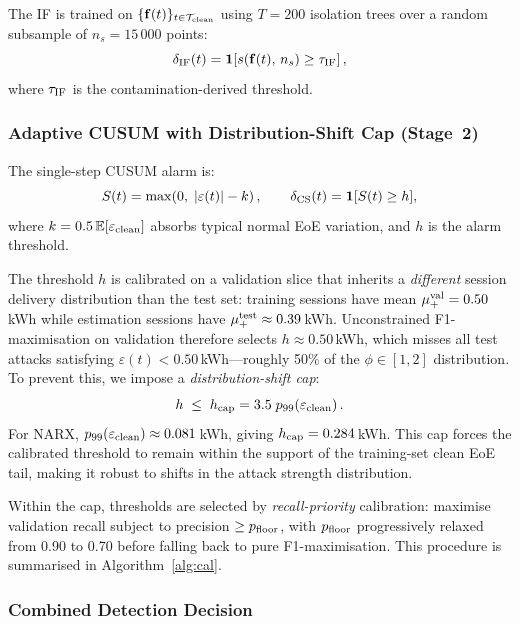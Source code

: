 \documentclass[journal]{IEEEtran}
\begin{document}
The IF is trained on $\{\mathbf{f}(t)\}_{t\in\mathcal{T}_{\rm clean}}$
using $T=200$ isolation trees over a random subsample of
$n_s=15\,000$ points:
\begin{equation}
  \delta_{\rm IF}(t) =
  \mathbf{1}\!\left[
    s\!\left(\mathbf{f}(t),\,n_s\right) \geq \tau_{\rm IF}
  \right],
  \label{eq:iflabel}
\end{equation}
where $\tau_{\rm IF}$ is the contamination-derived threshold.

\subsubsection{Adaptive CUSUM with Distribution-Shift Cap (Stage~2)}

The single-step CUSUM alarm is:
\begin{equation}
  S(t) = \max\!\left(0,\;|\varepsilon(t)| - k\right),
  \qquad
  \delta_{\rm CS}(t) = \mathbf{1}[S(t)\geq h],
  \label{eq:cusumfull}
\end{equation}
where $k = 0.5\,\mathbb{E}[\varepsilon_{\rm clean}]$ absorbs
typical normal EoE variation, and $h$ is the alarm threshold.

The threshold $h$ is calibrated on a validation slice that
inherits a \emph{different} session delivery distribution than the
test set: training sessions have mean $\mu_+^{\rm val}=0.50$\,kWh
while estimation sessions have $\mu_+^{\rm test}\approx0.39$\,kWh.
Unconstrained F1-maximisation on validation therefore selects
$h\approx0.50$\,kWh, which misses all test attacks satisfying
$\varepsilon(t)<0.50$\,kWh---roughly 50\% of the
$\phi\in[1,2]$ distribution.
To prevent this, we impose a \emph{distribution-shift cap}:
\begin{equation}
  h \;\leq\; h_{\rm cap} = 3.5\;p_{99}\!\left(\varepsilon_{\rm clean}\right).
  \label{eq:hcap}
\end{equation}
For NARX, $p_{99}(\varepsilon_{\rm clean})\approx0.081$\,kWh,
giving $h_{\rm cap}=0.284$\,kWh.
This cap forces the calibrated threshold to remain within the
support of the training-set clean EoE tail, making it robust to
shifts in the attack strength distribution.

Within the cap, thresholds are selected by
\emph{recall-priority} calibration: maximise validation recall
subject to precision $\geq p_{\rm floor}$, with $p_{\rm floor}$
progressively relaxed from 0.90 to 0.70 before falling back to
pure F1-maximisation.
This procedure is summarised in Algorithm~\ref{alg:cal}.

\subsubsection{Combined Detection Decision}
\end{document}
